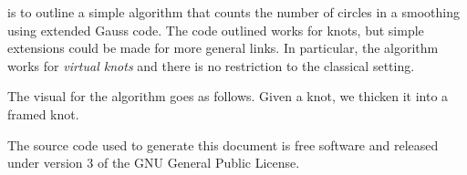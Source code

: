 \documentclass{article}
\theoremstyle{plain}
\begin{document}
        is to outline a simple algorithm that counts the number of circles in a
        smoothing using extended Gauss code. The code outlined works for knots,
        but simple extensions could be made for more general links. In
        particular, the algorithm works for \textit{virtual knots} and there is
        no restriction to the classical setting.
        \par\hfill\par
        The visual for the algorithm goes as follows. Given a knot, we thicken
        it into a framed knot.
    \newpage
    
    
    \newpage
    The source code used to generate this document is free software and released
    under version 3 of the GNU General Public License.
\end{document}
